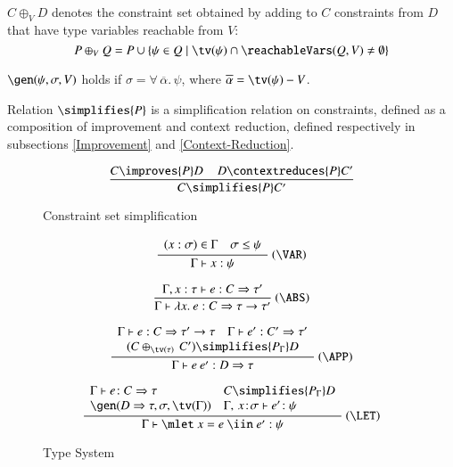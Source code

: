 \documentclass[review]{elsarticle}
\begin{document}
$C \oplus_V D$ denotes the constraint set obtained by adding to $C$
constraints from $D$ that have type variables reachable from $V$:
  \[ P \oplus_V Q = P \cup \{ \psi \in Q \mid \tv(\psi) \cap \reachableVars(Q,V) \not= \emptyset \} \]

$\gen(\psi,\sigma,V)$ holds if $\sigma =
\forall\,\overline{\alpha}.\,\psi$, where $\overline{\alpha} =
\tv(\psi) - V$.

Relation $\simplifies{P}$ is a simplification relation on
cons\-traints, defined as a composition of improvement and context
reduction, defined respectively in subsections \ref{Improvement} and
\ref{Context-Reduction}.

\begin{figure}
   \[ \displaystyle \frac
        {C \improves {P} D \hspace*{.4cm} D \contextreduces {P} C'}
        {C \simplifies {P} C'}
  \]
\caption{Constraint set simplification}
\label{Constraint-set-simplification}
\end{figure}

\begin{figure}
\[ \begin{array}{cc}
      \displaystyle\frac
        {\begin{array}[t]{ll}
           (x: \sigma) \in \Gamma & \sigma \leq \psi
         \end{array}}
        {\Gamma \vdash x: \psi} \:(\VAR) \\ \\

	\displaystyle\frac
          {\Gamma,x:\tau \vdash e: C \Rightarrow \tau'}
	  {\Gamma \vdash \lambda x.\:e: C\Rightarrow \tau \rightarrow \tau'} \:(\ABS)  \\ \\

	\displaystyle\frac
	  {\begin{array}[t]{cc}
             \Gamma \vdash e: C \Rightarrow \tau' \rightarrow \tau &
             \Gamma \vdash e': C' \Rightarrow \tau' \\
             \multicolumn{2}{c}{(C \oplus_{\tv(\tau)}\, C') \simplifies{P_\Gamma} D}
           \end{array}}
	{\Gamma \vdash e\:e': D\Rightarrow \tau} \:(\APP) \\ \\

	\displaystyle\frac
	 {\begin{array}{ll}
            \Gamma \vdash e\!:C \Rightarrow \tau & C \simplifies {P_\Gamma} D\\
             \gen(D\Rightarrow \tau,\sigma,\tv(\Gamma)) & \Gamma,\,x\!:\!\sigma \vdash e'\!:\psi
          \end{array}}
	 {\Gamma \vdash \mlet\ x=e\ \iin\ e':\psi} \:(\LET)
\end{array} \]
\caption{Type System}
\label{Type-system-fig}
\end{figure}
\end{document}
